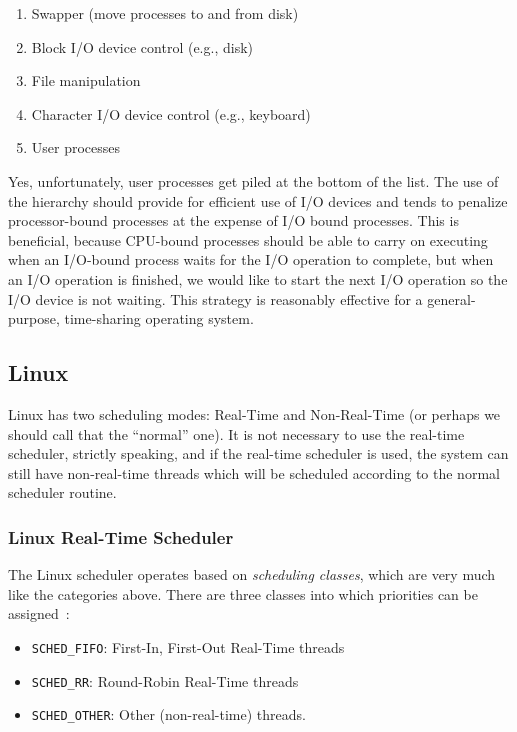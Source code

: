 \begin{enumerate}
	\item Swapper (move processes to and from disk)
	\item Block I/O device control (e.g., disk)
	\item File manipulation
	\item Character I/O device control (e.g., keyboard)
	\item User processes
\end{enumerate}

Yes, unfortunately, user processes get piled at the bottom of the list. The use of the hierarchy should provide for efficient use of I/O devices and tends to penalize processor-bound processes at the expense of I/O bound processes. This is beneficial, because CPU-bound processes should be able to carry on executing when an I/O-bound process waits for the I/O operation to complete, but when an I/O operation is finished, we would like to start the next I/O operation so the I/O device is not waiting. This strategy is reasonably effective for a general-purpose, time-sharing operating system.

\subsection*{Linux}
Linux has two scheduling modes: Real-Time and Non-Real-Time (or perhaps we should call that the ``normal'' one). It is not necessary to use the real-time scheduler, strictly speaking, and if the real-time scheduler is used, the system can still have non-real-time threads which will be scheduled according to the normal scheduler routine.

\subsubsection*{Linux Real-Time Scheduler}

The Linux scheduler operates based on \textit{scheduling classes}, which are very much like the categories above. There are three classes into which priorities can be assigned~\cite{osi}:

\begin{itemize}
	\item \texttt{SCHED\_FIFO}: First-In, First-Out Real-Time threads
	\item \texttt{SCHED\_RR}: Round-Robin Real-Time threads
	\item \texttt{SCHED\_OTHER}: Other (non-real-time) threads.
\end{itemize}

